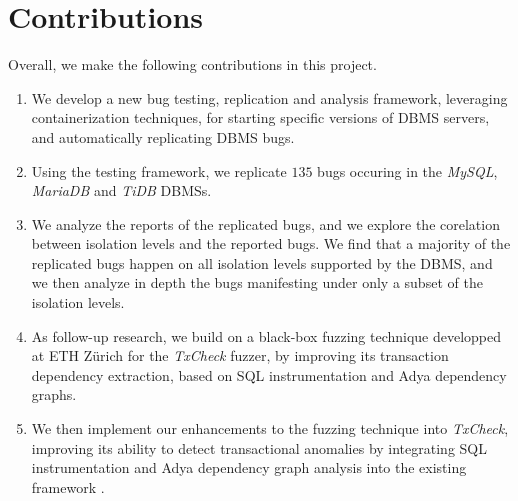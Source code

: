 

\section{Contributions}
Overall, we make the following contributions in this project.

\begin{enumerate}
    \item We develop a new bug testing, replication and analysis framework, leveraging containerization techniques, for starting specific versions of DBMS servers, and automatically replicating DBMS bugs.
    \item Using the testing framework, we replicate $135$ bugs occuring in the \textit{MySQL}, \textit{MariaDB} and \textit{TiDB} DBMSs.
    \item We analyze the reports of the replicated bugs, and we explore the corelation between isolation levels and the reported bugs. We find that a majority of the replicated bugs happen on all isolation levels supported by the DBMS, and we then analyze in depth the bugs manifesting under only a subset of the isolation levels.
    \item As follow-up research, we build on a black-box fuzzing technique developped at ETH Z\" urich for the \textit{TxCheck} fuzzer, by improving its transaction dependency extraction, based on SQL instrumentation and Adya dependency graphs.
    \item We then implement our enhancements to the fuzzing technique into \textit{TxCheck}, improving its ability to detect transactional anomalies by integrating SQL instrumentation and Adya dependency graph analysis into the existing framework \cite{jiang2023detecting}.
\end{enumerate}
